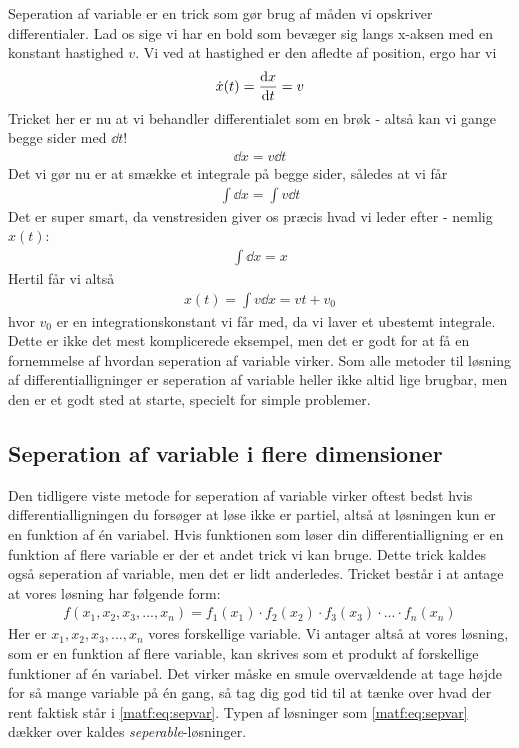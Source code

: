 \documentclass[crop=false, class=memoir]{standalone}
\begin{document}
Seperation af variable er en trick som gør brug af måden vi opskriver differentialer. Lad os sige vi har en bold som bevæger sig langs x-aksen med en konstant hastighed $v$. Vi ved at hastighed er den afledte af position, ergo har vi
\begin{align}
    \dot{x}(t) = \dv{x}{t} = v
\end{align}
Tricket her er nu at vi behandler differentialet som en brøk - altså kan vi gange begge sider med $\dd t$!
\begin{align}
    \dd x = v \dd t
\end{align}
Det vi gør nu er at smække et integrale på begge sider, således at vi får
\begin{align}
    \int \dd x = \int v \dd t
\end{align}
Det er super smart, da venstresiden giver os præcis hvad vi leder efter - nemlig $x(t)$:
\begin{align}
    \int \dd x = x
\end{align}
Hertil får vi altså
\begin{align}
    x(t) = \int v \dd x = v t + v_0
\end{align}
hvor $v_0$ er en integrationskonstant vi får med, da vi laver et ubestemt integrale. Dette er ikke det mest komplicerede eksempel, men det er godt for at få en fornemmelse af hvordan seperation af variable virker. Som alle metoder til løsning af differentialligninger er seperation af variable heller ikke altid lige brugbar, men den er et godt sted at starte, specielt for simple problemer.

\subsection{Seperation af variable i flere dimensioner}

Den tidligere viste metode for seperation af variable virker oftest bedst hvis differentialligningen du forsøger at løse ikke er partiel, altså at løsningen kun er en funktion af én variabel. Hvis funktionen som løser din differentialligning er en funktion af flere variable er der et andet trick vi kan bruge. Dette trick kaldes også seperation af variable, men det er lidt anderledes. Tricket består i at antage at vores løsning har følgende form:
\begin{align}
    f(x_1 , x_2, x_3 , ... , x_n ) = f_1(x_1) \cdot f_2(x_2) \cdot f_3(x_3) \cdot ... \cdot f_n(x_n)
    \label{matf:eq:sepvar}
\end{align}
Her er $x_1, x_2, x_3, ... , x_n$ vores forskellige variable. Vi antager altså at vores løsning, som er en funktion af flere variable, kan skrives som et produkt af forskellige funktioner af én variabel. Det virker måske en smule overvældende at tage højde for så mange variable på én gang, så tag dig god tid til at tænke over hvad der rent faktisk står i \cref{matf:eq:sepvar}. Typen af løsninger som \cref{matf:eq:sepvar} dækker over kaldes \emph{seperable}-løsninger.
\end{document}
